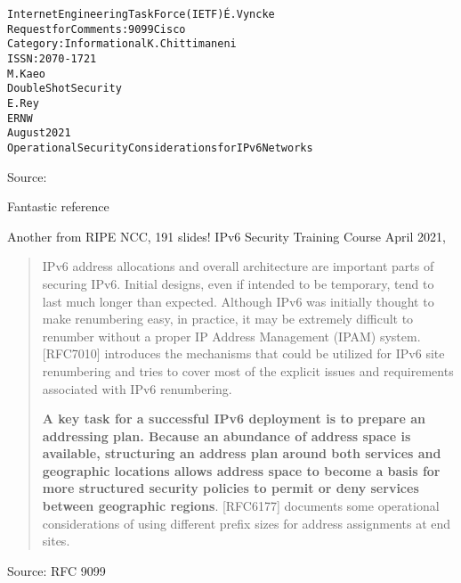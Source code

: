 \documentclass[Screen16to9,17pt]{foils}
\begin{document}

\begin{alltt}\small
Internet Engineering Task Force (IETF)                         É. Vyncke
Request for Comments: 9099                                         Cisco
Category: Informational                                  K. Chittimaneni
ISSN: 2070-1721
                                                                 M. Kaeo
                                                    Double Shot Security
                                                                  E. Rey
                                                                    ERNW
                                                             August 2021
         Operational Security Considerations for IPv6 Networks
\end{alltt}
Source: 

\begin{list2}
\item Fantastic reference
\item Another from RIPE NCC, 191 slides! IPv6 Security Training Course April 2021,\\
\end{list2}




\begin{quote}
IPv6 address allocations and overall architecture are important parts
of securing IPv6.  Initial designs, even if intended to be temporary,
tend to last much longer than expected.  Although IPv6 was initially
thought to make renumbering easy, in practice, it may be extremely
difficult to renumber without a proper IP Address Management (IPAM)
system.  [RFC7010] introduces the mechanisms that could be utilized
for IPv6 site renumbering and tries to cover most of the explicit
issues and requirements associated with IPv6 renumbering.

{\bf A key task for a successful IPv6 deployment is to prepare an
addressing plan.  Because an abundance of address space is available,
structuring an address plan around both services and geographic
locations allows address space to become a basis for more structured
security policies to permit or deny services between geographic
regions}.  [RFC6177] documents some operational considerations of
using different prefix sizes for address assignments at end sites.
\end{quote}
Source: RFC 9099
\end{document}
